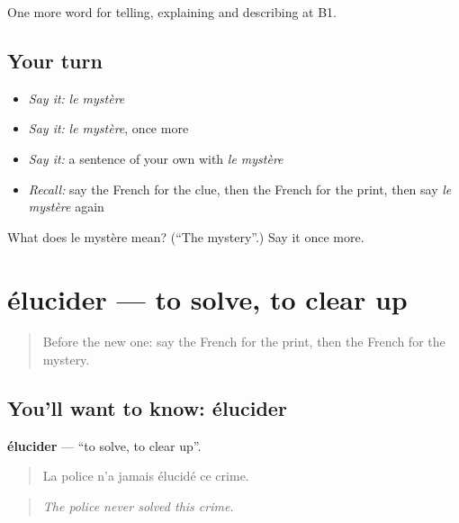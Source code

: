 \begin{grammarlens}[title={What you've built}]
One more word for telling, explaining and describing at B1.
\end{grammarlens}

\subsection*{Your turn}
\begin{itemize}
\raggedright
  \item \emph{Say it:} \emph{le mystère}
  \item \emph{Say it:} \emph{le mystère}, once more
  \item \emph{Say it:} a sentence of your own with \emph{le mystère}
  \item \emph{Recall:} say the French for the clue, then the French for the print, then say \emph{le mystère} again
\end{itemize}

\begin{tcolorbox}[breakable,colback=teal!4,colframe=teal!35!black,title={Before you move on}]
What does le mystère mean? (\textquotedblleft{}The mystery\textquotedblright{}.) Say it once more.
\end{tcolorbox}
\section[élucider]{élucider — to solve, to clear up}

\label{lesson:FR-C293-elucider}



\begin{quote}
Before the new one: say the French for the print, then the French for the mystery.
\end{quote}

\subsection*{You'll want to know: élucider}
\textbf{élucider} — \textquotedblleft{}to solve, to clear up\textquotedblright{}.

\begin{quote}
La police n'a jamais élucidé ce crime.
\end{quote}

\begin{quote}
\emph{The police never solved this crime.}
\end{quote}

